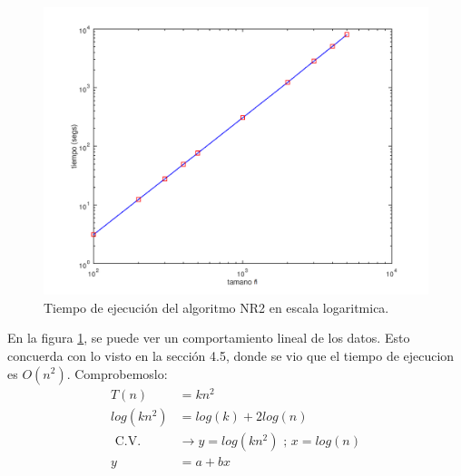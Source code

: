\begin{figure}[h!]
    \includegraphics[width=\linewidth]{Grafica_5_3_2.png}
    \caption{Tiempo de ejecución del algoritmo NR2 en escala logaritmica.}
    \label{fig:Grafica_5_3_2}
\end{figure}
En la figura \ref{fig:Grafica_5_3_2}, se puede ver un comportamiento lineal de los datos.
Esto concuerda con lo visto en la sección 4.5, donde se vio que el tiempo de ejecucion es $O(n^2)$.
Comprobemoslo:
\begin{align}
    T(n) &= kn^2 \\
    log(kn^2) &= log(k) + 2log(n) \\
    \text{ C.V.}& \rightarrow y = log(kn^2) \text{ ; } x = log(n) \\
    y &= a + bx
\end{align}

